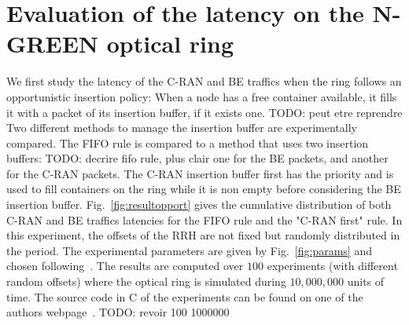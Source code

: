 \documentclass[10pt, conference, letterpaper]{IEEEtran}
\newcommand{\todo}[1]{{\color{red} TODO: {#1}}}
\begin{document}
   \section{Evaluation of the latency on the N-GREEN optical ring}
   \label{sec:oportmethods}
   
   
  We first study the latency of the C-RAN and BE traffics when the ring follows an opportunistic insertion policy: When a node has a free container available, it fills it with a packet of its insertion buffer, if it exists one.\todo{peut etre reprendre} 
 Two different methods to manage the insertion buffer are experimentally compared. The FIFO rule is compared to a method that uses two insertion buffers:\todo{decrire fifo rule, plus clair} one for the BE packets, and another for the C-RAN packets. The C-RAN insertion buffer first has the priority and is used to fill containers on the ring while it is non empty before considering the BE insertion buffer.  Fig.~\ref{fig:resultopport} gives the cumulative distribution of both C-RAN and BE traffics latencies for the FIFO rule and the "C-RAN first" rule. In this experiment, the offsets of the RRH are not fixed but randomly distributed in the period. The experimental parameters are given by Fig.~\ref{fig:params} and chosen following~\cite{ngreenarchitecture}. The results are computed over $100$ experiments (with different random offsets) where the optical ring is simulated during $10,000,000$ units of time. The source code in C of the experiments can be found on one of the authors webpage~\cite{webpage}. \todo{revoir 100 1000000}
  
   \vspace{0.5cm}
  \hspace{-0.75cm}
\end{document}
